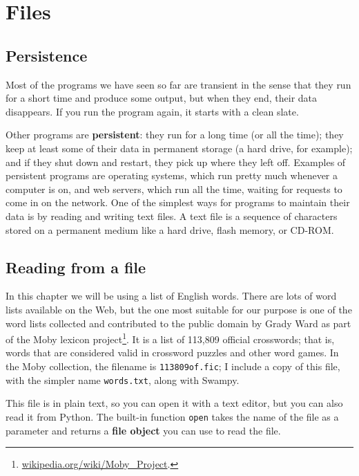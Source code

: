 \chapter{Files}



\section{Persistence}


Most of the programs we have seen so far are transient in the
sense that they run for a short time and produce some output,
but when they end, their data disappears.  If you run the program
again, it starts with a clean slate.

Other programs are {\bf persistent}: they run for a long time
(or all the time); they keep at least some of their data
in permanent storage (a hard drive, for example); and
if they shut down and restart, they pick up where they left off.
%
Examples of persistent programs are operating systems, which
run pretty much whenever a computer is on, and web servers,
which run all the time, waiting for requests to come in on
the network.
%
One of the simplest ways for programs to maintain their data
is by reading and writing text files. A text file is a sequence
of characters stored on a permanent medium like a hard drive, 
flash memory, or CD-ROM. 


\section{Reading from a file}
\label{wordlist}

In this chapter we will be using a list of English words.
There are lots of word lists available on the Web, but the one most
suitable for our purpose is one of the word lists collected and
contributed to the public domain by Grady Ward as part of the Moby
lexicon project\footnote{\url{wikipedia.org/wiki/Moby_Project}.}.  It
is a list of 113,809 official crosswords; that is, words that are
considered valid in crossword puzzles and other word games.  In the
Moby collection, the filename is {\tt 113809of.fic}; I include a copy
of this file, with the simpler name {\tt words.txt}, along with
Swampy.


This file is in plain text, so you can open it with a text
editor, but you can also read it from Python.  The built-in
function {\tt open} takes the name of the file as a parameter
and returns a {\bf file object} you can use to read the file.

